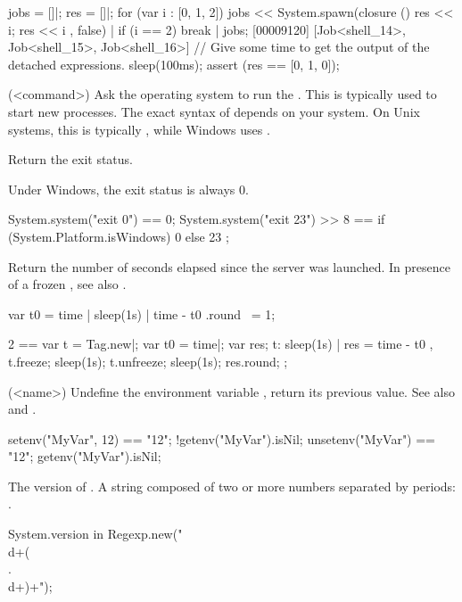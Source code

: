 \begin{urbiscriptapi}
\begin{urbiscript}
jobs = []|;
res = []|;
for (var i : [0, 1, 2])
{
  jobs << System.spawn(closure () { res << i; res << i },
                       false) |
  if (i == 2)
    break
}|
jobs;
[00009120] [Job<shell_14>, Job<shell_15>, Job<shell_16>]
// Give some time to get the output of the detached expressions.
sleep(100ms);
assert (res == [0, 1, 0]);
\end{urbiscript}





\item[system](<command>)%
  Ask the operating system to run the .  This is
  typically used to start new processes.  The exact syntax of
   depends on your system.  On Unix systems, this is
  typically , while Windows uses .

  Return the exit status.

  \begin{windows}
    Under Windows, the exit status is always 0.
  \end{windows}

\begin{urbiassert}
System.system("exit 0") == 0;
System.system("exit 23") >> 8
       == { if (System.Platform.isWindows) 0 else 23 };
\end{urbiassert}


\item[time] Return the number of seconds elapsed since the \urbi
  server was launched.  In presence of a frozen , see
  also .
\begin{urbiassert}
{ var t0 = time | sleep(1s) | time - t0 }.round ~= 1;

  2 ==
  {
    var t = Tag.new|;
    var t0 = time|;
    var res;
    t: { sleep(1s) | res = time - t0 },
    t.freeze;
    sleep(1s);
    t.unfreeze;
    sleep(1s);
    res.round;
  };
\end{urbiassert}


\item[unsetenv](<name>)%
  Undefine the environment variable , return its previous value.
  See also  and .

\begin{urbiassert}
setenv("MyVar", 12) == "12";
!getenv("MyVar").isNil;
unsetenv("MyVar") == "12";
getenv("MyVar").isNil;
\end{urbiassert}


\item[version]%
  The version of \usdk.  A string composed of two or more numbers separated
  by periods: .
\begin{urbiassert}
System.version in Regexp.new("\\d+(\\.\\d+)+");
\end{urbiassert}
\end{urbiscriptapi}

